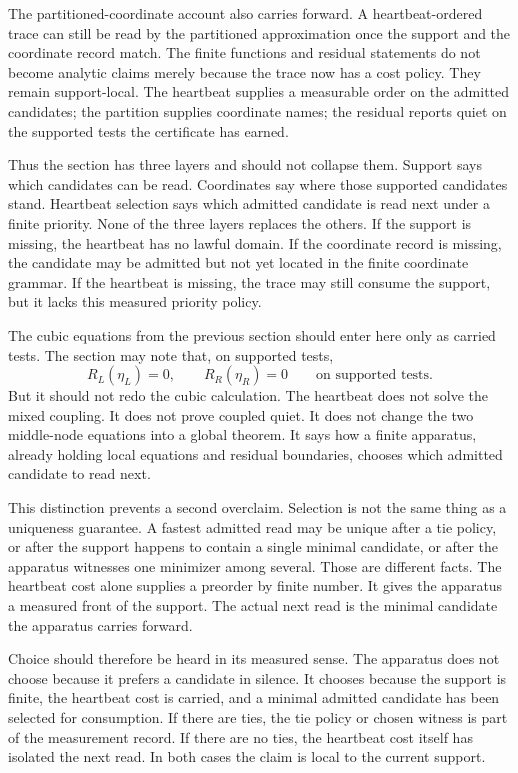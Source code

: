 The partitioned-coordinate account also carries forward. A heartbeat-ordered
trace can still be read by the partitioned approximation once the support and
the coordinate record match. The finite functions and residual statements do
not become analytic claims merely because the trace now has a cost policy.
They remain support-local. The heartbeat supplies a measurable order on the
admitted candidates; the partition supplies coordinate names; the residual
reports quiet on the supported tests the certificate has earned.

Thus the section has three layers and should not collapse them. Support says
which candidates can be read. Coordinates say where those supported candidates
stand. Heartbeat selection says which admitted candidate is read next under a
finite priority. None of the three layers replaces the others. If the support
is missing, the heartbeat has no lawful domain. If the coordinate record is
missing, the candidate may be admitted but not yet located in the finite
coordinate grammar. If the heartbeat is missing, the trace may still consume
the support, but it lacks this measured priority policy.

The cubic equations from the previous section should enter here only as carried tests. The section may note that, on supported tests,
\[
  R_L(\eta_L)=0,\qquad R_R(\eta_R)=0
  \qquad\text{on supported tests.}
\]
But it should not redo the cubic calculation. The heartbeat does not solve the
mixed coupling. It does not prove coupled quiet. It does not change the two
middle-node equations into a global theorem. It says how a finite apparatus,
already holding local equations and residual boundaries, chooses which
admitted candidate to read next.

This distinction prevents a second overclaim. Selection is not the same thing
as a uniqueness guarantee. A fastest admitted read may be unique after a tie
policy, or after the support happens to contain a single minimal candidate, or
after the apparatus witnesses one minimizer among several. Those are different
facts. The heartbeat cost alone supplies a preorder by finite number. It gives
the apparatus a measured front of the support. The actual next read is the
minimal candidate the apparatus carries forward.

Choice should therefore be heard in its measured sense. The apparatus
does not choose because it prefers a candidate in silence. It chooses because
the support is finite, the heartbeat cost is carried, and a minimal admitted
candidate has been selected for consumption. If there are ties, the tie policy
or chosen witness is part of the measurement record. If there are no ties, the
heartbeat cost itself has isolated the next read. In both cases the claim is
local to the current support.

